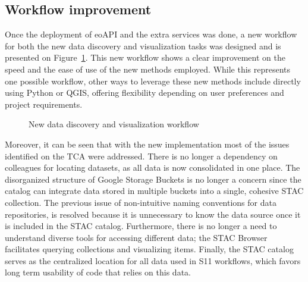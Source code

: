 \documentclass[
  oneside,
  open=any]{scrbook}
\begin{document}
\subsection{Workflow improvement}\label{workflow-improvement}

Once the deployment of eoAPI and the extra services was done, a new
workflow for both the new data discovery and visualization tasks was
designed and is presented on Figure~\ref{fig-new-workflow}. This new
workflow shows a clear improvement on the speed and the ease of use of
the new methods employed. While this represents one possible workflow,
other ways to leverage these new methods include directly using Python
or QGIS, offering flexibility depending on user preferences and project
requirements.

\begin{figure}[H]


\caption{\label{fig-new-workflow}New data discovery and visualization
workflow}

\end{figure}%

Moreover, it can be seen that with the new implementation most of the
issues identified on the TCA were addressed. There is no longer a
dependency on colleagues for locating datasets, as all data is now
consolidated in one place. The disorganized structure of Google Storage
Buckets is no longer a concern since the catalog can integrate data
stored in multiple buckets into a single, cohesive STAC collection. The
previous issue of non-intuitive naming conventions for data
repositories, is resolved because it is unnecessary to know the data
source once it is included in the STAC catalog. Furthermore, there is no
longer a need to understand diverse tools for accessing different data;
the STAC Browser facilitates querying collections and visualizing items.
Finally, the STAC catalog serves as the centralized location for all
data used in S11 workflows, which favors long term usability of code
that relies on this data.
\end{document}
